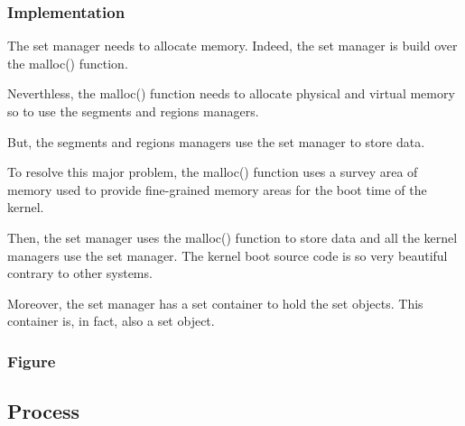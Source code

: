 \documentclass[8pt]{beamer}
\newcommand{\nl}[0]{\vspace{0.4cm}}
\begin{document}
\begin{frame}
  \frametitle{Implementation}

  The set manager needs to allocate memory. Indeed, the set manager
  is build over the malloc() function.

  \nl

  Neverthless, the malloc() function needs to allocate physical and
  virtual memory so to use the segments and regions managers.

  \nl

  But, the segments and regions managers use the set manager to store data.

  \nl

  To resolve this major problem, the malloc() function uses a survey area
  of memory used to provide fine-grained memory areas for the boot time
  of the kernel.

  \nl

  Then, the set manager uses the malloc() function to store data and all
  the kernel managers use the set manager. The kernel boot source code
  is so very beautiful contrary to other systems.

  \nl

  Moreover, the set manager has a set container to hold the set objects. This
  container is, in fact, also a set object.
\end{frame}


\begin{frame}
  \frametitle{Figure}

  \begin{center}
  \end{center}
\end{frame}

%
%

\subsection{Process}

\end{document}

